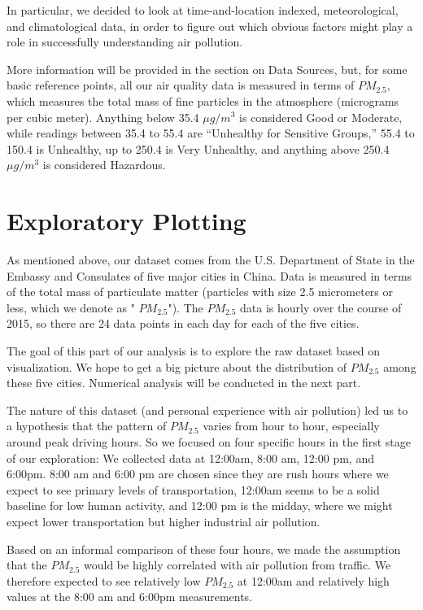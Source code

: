 \documentclass[11pt]{article} %
\begin{document}
In particular, we decided to look at time-and-location indexed, meteorological, and climatological data,
in order to figure out which obvious factors might play a role in successfully understanding air pollution.

More information will be provided in the section on Data Sources, 
but, for some basic reference points, all our air quality data is measured in terms of 
\(PM_{2.5}\), which measures the 
total mass of fine particles in the atmosphere (micrograms
per cubic meter). Anything below 35.4 \(\mu g/m^3\) is considered
Good or Moderate, while readings between 35.4 to 55.4 are ``Unhealthy for Sensitive Groups,''
55.4 to 150.4 is Unhealthy, up to 250.4 is Very Unhealthy, and anything above 250.4  \(\mu g/m^3\)
is considered Hazardous.

\section{Exploratory Plotting}

	As mentioned above, our dataset comes from the U.S. Department of State in the Embassy and Consulates of five major cities in China. Data is measured in terms of the total mass of particulate matter (particles with size 2.5 micrometers or less, which we denote as " \(PM_{2.5}\)"). The  \(PM_{2.5}\) data is hourly over the course of 2015, so there are 24 data points in each day for each of the five cities.

	The goal of this part of our analysis is to explore the raw dataset based on visualization. We hope to get a big picture about the distribution of  \(PM_{2.5}\) among these five cities. Numerical analysis will be conducted in the next part.

	The nature of this dataset (and personal experience with air pollution) led us to a hypothesis that the pattern of \(PM_{2.5}\) varies from hour to hour, especially around peak driving hours. So we focused on four specific hours in the first stage of our exploration: We collected data at 12:00am, 8:00 am, 12:00 pm, and 6:00pm. 8:00 am and 6:00 pm are chosen since they are rush hours where we expect to see primary levels of transportation, 12:00am seems to be a solid baseline for low human activity, and 12:00 pm is the midday, where we might expect lower transportation but higher industrial air pollution.

	Based on an informal comparison of these four hours, we made the assumption that the \(PM_{2.5}\) would be highly correlated with air pollution from traffic. We therefore expected to see relatively low \(PM_{2.5}\) at 12:00am and relatively high values at the 8:00 am and 6:00pm measurements.
\end{document}
